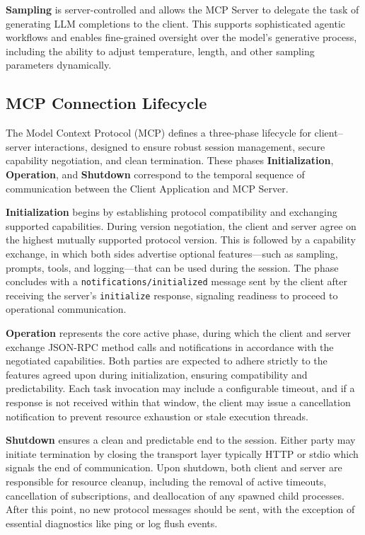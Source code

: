 \documentclass{article}
\begin{document}
\textbf{Sampling} is server-controlled and allows the MCP Server to delegate the task of generating LLM completions to the client. This supports sophisticated agentic workflows and enables fine-grained oversight over the model’s generative process, including the ability to adjust temperature, length, and other sampling parameters dynamically.

\subsection{MCP Connection Lifecycle}

The Model Context Protocol (MCP) defines a three-phase lifecycle for client–server interactions, designed to ensure robust session management, secure capability negotiation, and clean termination. These phases \textbf{Initialization}, \textbf{Operation}, and \textbf{Shutdown} correspond to the temporal sequence of communication between the Client Application and MCP Server.

\textbf{Initialization} begins by establishing protocol compatibility and exchanging supported capabilities. During version negotiation, the client and server agree on the highest mutually supported protocol version. This is followed by a capability exchange, in which both sides advertise optional features—such as sampling, prompts, tools, and logging—that can be used during the session. The phase concludes with a \texttt{notifications/initialized} message sent by the client after receiving the server’s \texttt{initialize} response, signaling readiness to proceed to operational communication.

\textbf{Operation} represents the core active phase, during which the client and server exchange JSON-RPC method calls and notifications in accordance with the negotiated capabilities. Both parties are expected to adhere strictly to the features agreed upon during initialization, ensuring compatibility and predictability. Each task invocation may include a configurable timeout, and if a response is not received within that window, the client may issue a cancellation notification to prevent resource exhaustion or stale execution threads.

\textbf{Shutdown} ensures a clean and predictable end to the session. Either party may initiate termination by closing the transport layer typically HTTP or stdio which signals the end of communication. Upon shutdown, both client and server are responsible for resource cleanup, including the removal of active timeouts, cancellation of subscriptions, and deallocation of any spawned child processes. After this point, no new protocol messages should be sent, with the exception of essential diagnostics like ping or log flush events.
\end{document}
